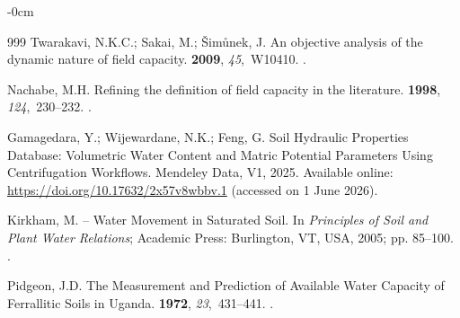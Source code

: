 \documentclass[land,review,accept,pdftex,oneauthor]{Definitions/mdpi}
\begin{document}
\begin{adjustwidth}{-\extralength}{0cm}
\begin{thebibliography}{999}
Twarakavi, N.K.C.; Sakai, M.; Šimůnek, J.
\newblock An objective analysis of the dynamic nature of field capacity.
 {\bf 2009}, {\em 45},~W10410. %
.

Nachabe, M.H.
\newblock Refining the definition of field capacity in the literature.
 {\bf 1998}, {\em
  124},~230--232.
.

Gamagedara, Y.; Wijewardane, N.K.; Feng, G.
\newblock Soil Hydraulic Properties Database: Volumetric Water Content and
  Matric Potential Parameters Using Centrifugation Workflows. %
\newblock Mendeley Data, V1, 2025. Available online: \url{https://doi.org/10.17632/2x57v8wbbv.1} (accessed on 1 June 2026).

Kirkham, M.
 -- Water Movement in Saturated Soil. In {\em Principles of Soil and
  Plant Water Relations}; Academic Press: Burlington, VT, USA, 2005; pp. 85--100.
.

Pidgeon, J.D.
\newblock The Measurement and Prediction of Available Water Capacity of
  Ferrallitic Soils in Uganda.
 {\bf 1972}, {\em 23},~431--441.
.


\end{thebibliography}
\end{adjustwidth}
\end{document}
